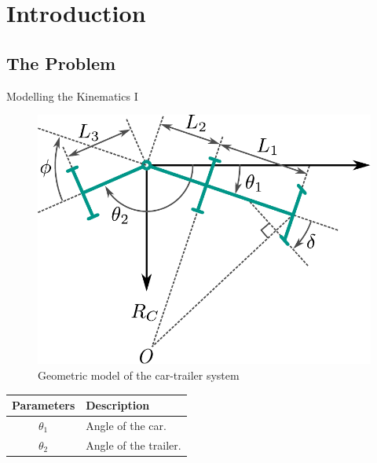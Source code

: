 \section{Introduction}

\subsection{The Problem}
\begin{frame}{Modelling the Kinematics I}
\begin{minipage}{.4\textwidth}
    \begin{figure}[H]
        \centering
        \includegraphics[width=\textwidth]{images/trailer-diagram}
        \caption{Geometric model of the car-trailer system}
        \label{fig:geom-model}
    \end{figure}
\end{minipage}%
\begin{minipage}{0.6\textwidth}
    \begin{table}[H]
        \tiny
        \centering
        \begin{tabularx}{0.95\textwidth}{c X}
            \toprule
            \toprule
            Parameters & Description \\
            \midrule
            $\theta_{1}$  & Angle of the car. \\
            $\theta_{2}$  & Angle of the trailer. \\

\end{tabularx}
\end{table}
\end{minipage}
\end{frame}
